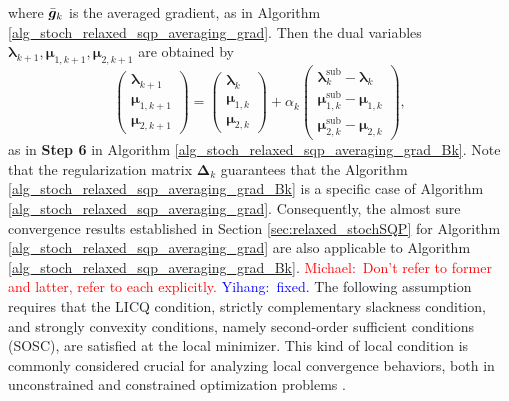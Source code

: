 \documentclass[aos]{imsart}
\numberwithin{equation}{section}
\theoremstyle{plain}
\newcommand{\michael}[1]{\textcolor{red}{Michael:\ #1}}
\newcommand{\yihang}[1]{\textcolor{blue}{Yihang:\ #1}}
\begin{document}
where $\Bar{\bm{g}}_{k}$ is the averaged gradient, as in Algorithm \ref{alg_stoch_relaxed_sqp_averaging_grad}. Then the dual variables $\bm{\lambda}_{k+1}, \bm{\mu}_{1,k+1}, \bm{\mu}_{2,k+1}$ are obtained by
\begin{equation}
\label{update_dual}
    \left( \begin{array}{c}
         \bm{\lambda}_{k+1} \\
         \bm{\mu}_{1,k+1} \\
         \bm{\mu}_{2,k+1}
    \end{array} \right) = \left( \begin{array}{c}
         \bm{\lambda}_{k} \\
         \bm{\mu}_{1,k} \\
         \bm{\mu}_{2,k}
    \end{array} \right) + \alpha_k \left( \begin{array}{c}
         \bm{\lambda}_k^{\text{sub}} - \bm{\lambda}_{k} \\
         \bm{\mu}_{1,k}^{\text{sub}} - \bm{\mu}_{1,k} \\
         \bm{\mu}_{2,k}^{\text{sub}} - \bm{\mu}_{2,k}
    \end{array} \right),
\end{equation}
as in \textbf{Step 6} in Algorithm \ref{alg_stoch_relaxed_sqp_averaging_grad_Bk}.
Note that the regularization matrix $\bm{\Delta}_k$ guarantees that the Algorithm \ref{alg_stoch_relaxed_sqp_averaging_grad_Bk} is a specific case of Algorithm \ref{alg_stoch_relaxed_sqp_averaging_grad}. 
Consequently, the almost sure convergence results established in Section \ref{sec:relaxed_stochSQP} for Algorithm \ref{alg_stoch_relaxed_sqp_averaging_grad} are also applicable to Algorithm \ref{alg_stoch_relaxed_sqp_averaging_grad_Bk}. 
\michael{Don't refer to former and latter, refer to each explicitly.} \yihang{fixed.}
The following assumption requires that the LICQ condition, strictly complementary slackness condition, and strongly convexity conditions, namely second-order sufficient conditions (SOSC), are satisfied at the local minimizer. This kind of local condition is commonly considered crucial for analyzing local convergence behaviors, both in unconstrained and constrained optimization problems \cite{jorge2006numerical}.
\end{document}
